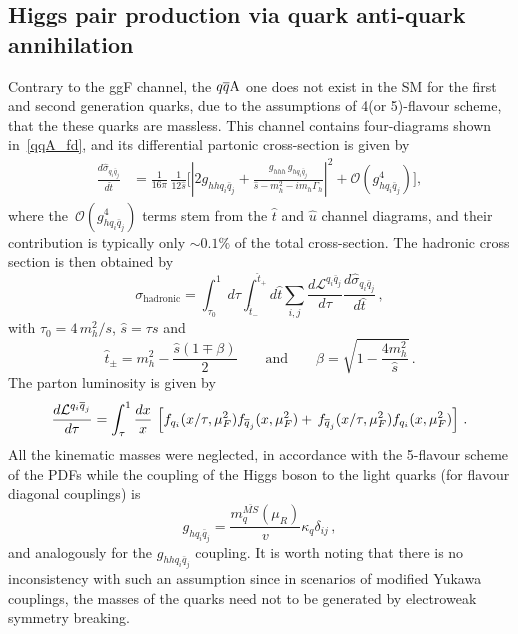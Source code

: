 \subsection{Higgs pair production via quark anti-quark annihilation}
Contrary to the ggF channel, the $\qqA$ one does not exist in the SM for the first and second generation quarks, due to the assumptions of 4(or 5)-flavour scheme, that the these quarks are massless.  This channel contains four-diagrams shown in~\autoref{qqA_fd}, and its  differential partonic cross-section is given by 
\begin{align}
	\frac{d \hat \sigma_{q_i\bar{q}_j}}{d \hat t} &= \frac{1}{16 \pi}\, \frac{1}{12  \hat{s}} \bigg[ \left| 2  g_{hh q_i \bar q_j} + \frac{g_{hhh}\, g_{h q_i \bar q_j}}{\hat{s}-m_h^2-im_h\Gamma_h}\right|^2+ \mathcal{O}(g_{h q_i \bar q_j}^4) \bigg],
	\label{sigmaqqa}
\end{align}
where the~$ \mathcal{O}(g_{h q_i \bar q_j}^4)$ terms stem from the $\hat{t}$ and $\hat{u}$ channel diagrams, and their contribution is typically only $\sim 0.1 \%$ of the total cross-section.
The hadronic cross section is then obtained by
\begin{equation}
	\sigma_{\mathrm{hadronic}} =  \int_{\tau_0}^1 d\tau \int_{\hat{t}_-}^{\hat{t}_+} d\hat{t} \sum_{i,j} \frac{d\mathcal{L}^{q_i\bar{q}_j}}{d\tau}\frac{ d\hat \sigma_{q_i\bar{q}_j}}{d \hat t}\,, \label{eq:sigmahadron}
\end{equation}
with $ \tau_0= 4\, m_h^2/s$, $\hat{s}=\tau s$ and
\begin{equation}
	\hat{t}_{\pm}=m_h^2-\frac{\hat{s}(1\mp \beta)}{2} \quad\quad \text{and}\quad \quad \beta=\sqrt{1-\frac{4 m_h^2}{\hat{s}}}\,.
\end{equation}
The parton luminosity is given by
\begin{equation}
	\frac{d{\cal L}^{q_i \bar q_j}}{d\tau} = \int_\tau ^1 \frac{dx}{x} \,\left[  f_{q_i}(x/\tau,\mu_F^2) f_{\bar{q}_j}(x,\mu_F^2) + \,f_{\bar{q}_j}(x/\tau,\mu_F^2) f_{q_i}(x,\mu_F^2)\right]\,.
\end{equation}
All the kinematic masses were neglected, in accordance with the 5-flavour scheme of the PDFs while the coupling of the Higgs boson to the light quarks (for flavour diagonal couplings) is
\begin{equation}
	g_{hq_i\bar{q}_j}=\frac{m^{\bar{MS}}_q(\mu_R)}{v}  \kappa_q \delta_{ij}\,,
\end{equation}
and analogously for the $g_{hhq_i\bar{q}_j}$ coupling.  It is worth noting that there is no inconsistency with such an assumption since in scenarios of modified Yukawa couplings, the masses of the quarks need not to be generated by electroweak symmetry breaking.
%
